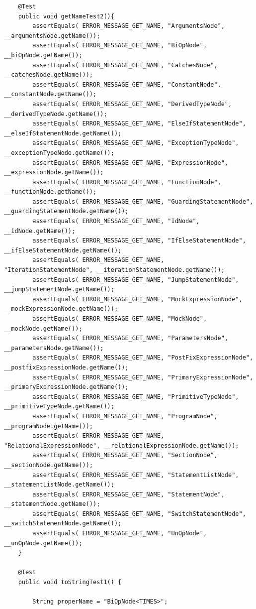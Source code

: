 \documentclass{report}
\begin{document}
\begin{verbatim}
	@Test
	public void getNameTest2(){
		assertEquals( ERROR_MESSAGE_GET_NAME, "ArgumentsNode", __argumentsNode.getName());
		assertEquals( ERROR_MESSAGE_GET_NAME, "BiOpNode", __biOpNode.getName());
		assertEquals( ERROR_MESSAGE_GET_NAME, "CatchesNode", __catchesNode.getName());
		assertEquals( ERROR_MESSAGE_GET_NAME, "ConstantNode", __constantNode.getName());
		assertEquals( ERROR_MESSAGE_GET_NAME, "DerivedTypeNode", __derivedTypeNode.getName());
		assertEquals( ERROR_MESSAGE_GET_NAME, "ElseIfStatementNode", __elseIfStatementNode.getName());
		assertEquals( ERROR_MESSAGE_GET_NAME, "ExceptionTypeNode", __exceptionTypeNode.getName());
		assertEquals( ERROR_MESSAGE_GET_NAME, "ExpressionNode", __expressionNode.getName());
		assertEquals( ERROR_MESSAGE_GET_NAME, "FunctionNode", __functionNode.getName());
		assertEquals( ERROR_MESSAGE_GET_NAME, "GuardingStatementNode", __guardingStatementNode.getName());
		assertEquals( ERROR_MESSAGE_GET_NAME, "IdNode", __idNode.getName());
		assertEquals( ERROR_MESSAGE_GET_NAME, "IfElseStatementNode", __ifElseStatementNode.getName());
		assertEquals( ERROR_MESSAGE_GET_NAME, "IterationStatementNode", __iterationStatementNode.getName());
		assertEquals( ERROR_MESSAGE_GET_NAME, "JumpStatementNode", __jumpStatementNode.getName());
		assertEquals( ERROR_MESSAGE_GET_NAME, "MockExpressionNode", __mockExpressionNode.getName());
		assertEquals( ERROR_MESSAGE_GET_NAME, "MockNode", __mockNode.getName());
		assertEquals( ERROR_MESSAGE_GET_NAME, "ParametersNode", __parametersNode.getName());
		assertEquals( ERROR_MESSAGE_GET_NAME, "PostFixExpressionNode", __postfixExpressionNode.getName());
		assertEquals( ERROR_MESSAGE_GET_NAME, "PrimaryExpressionNode", __primaryExpressionNode.getName());
		assertEquals( ERROR_MESSAGE_GET_NAME, "PrimitiveTypeNode", __primitiveTypeNode.getName());
		assertEquals( ERROR_MESSAGE_GET_NAME, "ProgramNode", __programNode.getName());
		assertEquals( ERROR_MESSAGE_GET_NAME, "RelationalExpressionNode", __relationalExpressionNode.getName());
		assertEquals( ERROR_MESSAGE_GET_NAME, "SectionNode", __sectionNode.getName());
		assertEquals( ERROR_MESSAGE_GET_NAME, "StatementListNode", __statementListNode.getName());
		assertEquals( ERROR_MESSAGE_GET_NAME, "StatementNode", __statementNode.getName());
		assertEquals( ERROR_MESSAGE_GET_NAME, "SwitchStatementNode", __switchStatementNode.getName());
		assertEquals( ERROR_MESSAGE_GET_NAME, "UnOpNode", __unOpNode.getName());		
	}
	
	@Test
	public void toStringTest1() {

		String properName = "BiOpNode<TIMES>";


\end{verbatim}
\end{document}
